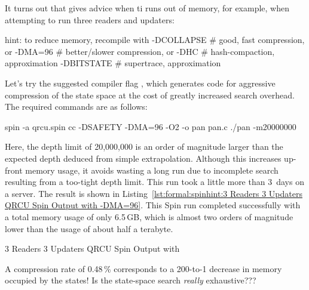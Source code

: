 It turns out that  gives advice when ti runs out of memory,
for example, when attempting to run three readers and updaters:

\begin{VerbatimU}
hint: to reduce memory, recompile with
  -DCOLLAPSE # good, fast compression, or
  -DMA=96   # better/slower compression, or
  -DHC # hash-compaction, approximation
  -DBITSTATE # supertrace, approximation
\end{VerbatimU}

Let's try the suggested compiler flag ,
which generates code for aggressive compression of the
state space at the cost of greatly increased search overhead.
The required commands are as follows:

\begin{VerbatimU}
spin -a qrcu.spin
cc -DSAFETY -DMA=96 -O2 -o pan pan.c
./pan -m20000000
\end{VerbatimU}

Here, the depth limit of 20,000,000 is an order of magnitude
larger than the expected depth deduced from simple extrapolation.
Although this increases up-front memory usage, it avoids wasting
a long run due to incomplete search resulting from a too-tight
depth limit.
This run took a little more than 3~days on a  server.
The result is shown in
Listing~\ref{lst:formal:spinhint:3 Readers 3 Updaters QRCU Spin Output with -DMA=96}.
This Spin run completed successfully with a total memory
usage of only 6.5\,GB, which is almost two orders of magnitude
lower than the  usage of about half a terabyte.

\begin{listing}
\vspace*{-9pt}
\caption{3 Readers 3 Updaters QRCU Spin Output with }
\label{lst:formal:spinhint:3 Readers 3 Updaters QRCU Spin Output with -DMA=96}
\end{listing}

\QuickQuiz{}
	A compression rate of 0.48\,\% corresponds to a 200-to-1 decrease
	in memory occupied by the states!
	Is the state-space search \emph{really} exhaustive???
 \QuickQuizEnd

